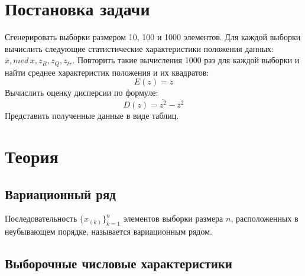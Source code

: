 \documentclass[a4paper]{article}
\begin{document}
    
    \tableofcontents
    \newpage
    \listoftables
    \newpage
    \section{Постановка задачи}
    Сгенерировать выборки размером 10, 100 и 1000 элементов.
    Для каждой выборки вычислить следующие статистические характеристики положения данных: $\overline{x}, med\,x, z_R, z_Q, z_{tr}$.
    Повторить такие вычисления 1000 раз для каждой выборки и найти среднее характеристик положения и их квадратов:
    \begin{equation}\label{eq:mean_formula}
        E(z)=\overline{z}
    \end{equation}
    Вычислить оценку дисперсии по формуле:
    \begin{equation}\label{eq:variance_formula}
        D(z)=\overline{z^2}-\overline{z}^2
    \end{equation}
    Представить полученные данные в виде таблиц.
    \section{Теория}
    \subsection{Вариационный ряд}
Последовательность $\displaystyle\{x_{(k)}\}_{k=1}^n$ элементов выборки размера $n$, расположенных в неубывающем порядке, называется вариационным рядом.
\subsection{Выборочные числовые характеристики}
\end{document}
